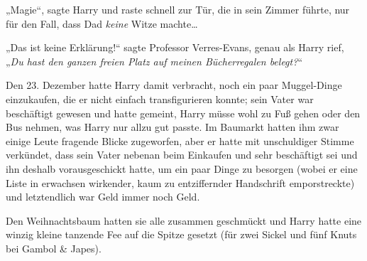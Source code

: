 „Magie“, sagte Harry und raste schnell zur Tür, die in sein Zimmer führte, nur für den Fall, dass Dad \emph{keine} Witze machte…

„Das ist keine Erklärung!“ sagte Professor Verres-Evans, genau als Harry rief, „\emph{Du hast den ganzen freien Platz auf meinen Bücherregalen belegt?}“

\later

Den 23. Dezember hatte Harry damit verbracht, noch ein paar Muggel-Dinge einzukaufen, die er nicht einfach transfigurieren konnte; sein Vater war beschäftigt gewesen und hatte gemeint, Harry müsse wohl zu Fuß gehen oder den Bus nehmen, was Harry nur allzu gut passte. Im Baumarkt hatten ihm zwar einige Leute fragende Blicke zugeworfen, aber er hatte mit unschuldiger Stimme verkündet, dass sein Vater nebenan beim Einkaufen und sehr beschäftigt sei und ihn deshalb vorausgeschickt hatte, um ein paar Dinge zu besorgen (wobei er eine Liste in erwachsen wirkender, kaum zu entziffernder Handschrift emporstreckte) und letztendlich war Geld immer noch Geld.

Den Weihnachtsbaum hatten sie alle zusammen geschmückt und Harry hatte eine winzig kleine tanzende Fee auf die Spitze gesetzt (für zwei Sickel und fünf Knuts bei Gambol \& Japes).

